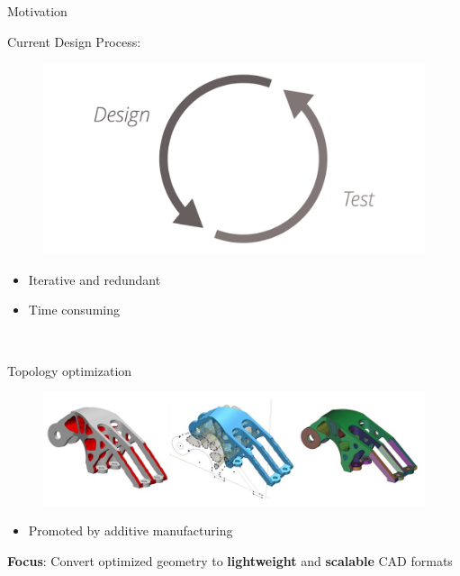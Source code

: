 

\begin{frame}{Motivation}
\begin{multicols}{2}
Current Design Process:
\begin{figure}
\includegraphics[width=0.8\linewidth]{Pictures/Motivation/DesignTest.png}
\end{figure}
\begin{itemize}
\item Iterative and redundant
\item Time consuming
\end{itemize}~\\

\vfill
\columnbreak

\pause

Topology optimization
\begin{figure}
\includegraphics[width=0.9\linewidth]{Pictures/Motivation/TopOpt.jpg}
\end{figure}
\begin{itemize}
\item Promoted by additive manufacturing
\end{itemize}


\pause
\end{multicols}
\begin{tcolorbox}
\textbf{Focus}: Convert optimized geometry to \textbf{lightweight} and \textbf{scalable} CAD formats
\end{tcolorbox}

\end{frame}


